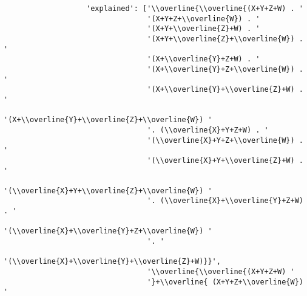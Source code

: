\begin{verbatim}
                   'explained': ['\\overline{\\overline{(X+Y+Z+W) . '
                                 '(X+Y+Z+\\overline{W}) . '
                                 '(X+Y+\\overline{Z}+W) . '
                                 '(X+Y+\\overline{Z}+\\overline{W}) . '
                                 '(X+\\overline{Y}+Z+W) . '
                                 '(X+\\overline{Y}+Z+\\overline{W}) . '
                                 '(X+\\overline{Y}+\\overline{Z}+W) . '
                                 '(X+\\overline{Y}+\\overline{Z}+\\overline{W}) '
                                 '. (\\overline{X}+Y+Z+W) . '
                                 '(\\overline{X}+Y+Z+\\overline{W}) . '
                                 '(\\overline{X}+Y+\\overline{Z}+W) . '
                                 '(\\overline{X}+Y+\\overline{Z}+\\overline{W}) '
                                 '. (\\overline{X}+\\overline{Y}+Z+W) . '
                                 '(\\overline{X}+\\overline{Y}+Z+\\overline{W}) '
                                 '. '
                                 '(\\overline{X}+\\overline{Y}+\\overline{Z}+W)}}',
                                 '\\overline{\\overline{(X+Y+Z+W) '
                                 '}+\\overline{ (X+Y+Z+\\overline{W}) '

\end{verbatim}
